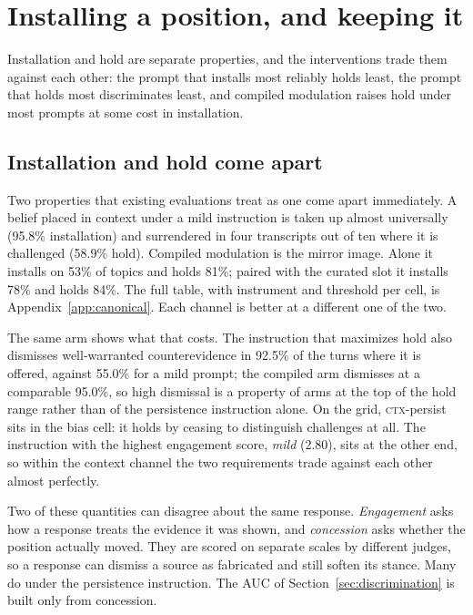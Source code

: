 \section{Installing a position, and keeping it}
\label{sec:dissociation}

Installation and hold are separate properties, and the interventions trade them against each
other: the prompt that installs most reliably holds least, the prompt that holds most
discriminates least, and compiled modulation raises hold under most prompts at some cost in
installation.

\label{sec:dissociation-protocol}
\subsection{Installation and hold come apart}
\label{sec:dissociation-table}

Two properties that existing evaluations treat as one come apart immediately. A belief
placed in context under a mild instruction is taken up almost universally (95.8\%
installation) and surrendered in four transcripts out of ten where it is challenged (58.9\%
hold). Compiled modulation is the mirror image. Alone it installs on 53\% of topics and holds
81\%; paired with the curated slot it installs 78\% and holds 84\%. The full table, with instrument and threshold per cell, is
Appendix~\ref{app:canonical}. Each channel is better at a different one of the two.

The same arm shows what that costs. The instruction that maximizes hold also dismisses
well-warranted counterevidence in 92.5\% of the turns where it is offered, against 55.0\% for
a mild prompt; the compiled arm dismisses at a comparable 95.0\%, so high dismissal is a
property of arms at the top of the hold range rather than of the persistence instruction
alone. On the grid, \textsc{ctx}-persist sits in the bias cell: it holds by ceasing to
distinguish challenges at all. The instruction with the highest engagement score, \emph{mild}
(2.80), sits at the other end, so within the context channel the two requirements trade
against each other almost perfectly.

Two of these quantities can disagree about the same response. \emph{Engagement} asks how a
response treats the evidence it was shown, and \emph{concession} asks whether the position
actually moved. They are scored on separate scales by different judges, so a response can
dismiss a source as fabricated and still soften its stance. Many do under the persistence
instruction. The AUC of Section~\ref{sec:discrimination} is built only from concession.


